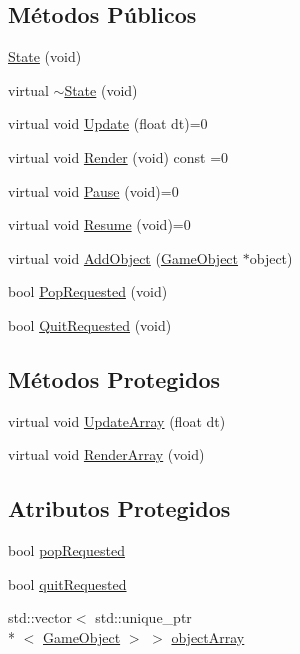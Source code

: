 \subsection*{Métodos Públicos}
\begin{DoxyCompactItemize}
\item 
\hyperlink{classState_aef73d18751fc737c6b4f0893660a0d81}{State} (void)
\item 
virtual \hyperlink{classState_a42d951e307f5b6d1966e15f417cc4101}{$\sim$\+State} (void)
\item 
virtual void \hyperlink{classState_ad79561dfb4e1a6b722a3d9c84b06e91c}{Update} (float dt)=0
\item 
virtual void \hyperlink{classState_ad1f023e61676d0cef92afbaba48ec7ca}{Render} (void) const =0
\item 
virtual void \hyperlink{classState_ae9fa377b30f06fdd809a1557bfbc190a}{Pause} (void)=0
\item 
virtual void \hyperlink{classState_ac6d3f8b50530eec89e1344bab93f1006}{Resume} (void)=0
\item 
virtual void \hyperlink{classState_a431d5f711e028c788a9fdccaf99ff74e}{Add\+Object} (\hyperlink{classGameObject}{Game\+Object} $\ast$object)
\item 
bool \hyperlink{classState_af898168550c4a26b71e4f9ddb0e1f338}{Pop\+Requested} (void)
\item 
bool \hyperlink{classState_a1645048aadaadad50404ff1868e11bb2}{Quit\+Requested} (void)
\end{DoxyCompactItemize}
\subsection*{Métodos Protegidos}
\begin{DoxyCompactItemize}
\item 
virtual void \hyperlink{classState_abb605ec5fe585d227fbf267e0e6c80a9}{Update\+Array} (float dt)
\item 
virtual void \hyperlink{classState_a9a7458d8c801f4d02fd1732a300c8b97}{Render\+Array} (void)
\end{DoxyCompactItemize}
\subsection*{Atributos Protegidos}
\begin{DoxyCompactItemize}
\item 
bool \hyperlink{classState_a9d7c1082cc6592646acec05a6e46f145}{pop\+Requested}
\item 
bool \hyperlink{classState_aa96884ddc05e8f23841298af662ae733}{quit\+Requested}
\item 
std\+::vector$<$ std\+::unique\+\_\+ptr\\*
$<$ \hyperlink{classGameObject}{Game\+Object} $>$ $>$ \hyperlink{classState_a08eaf3c9720d7f90ce579630ca938687}{object\+Array}
\end{DoxyCompactItemize}


